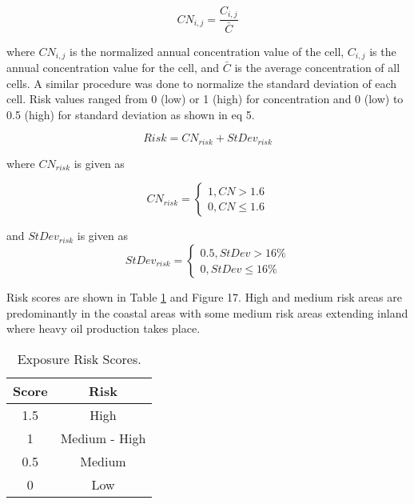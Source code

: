 \begin{equation}
\label{eq:normconcentrate}
CN_{i,j}=\frac{C_{i,j}}{\bar{C}}
\end{equation}

\noindent
where $CN_{i,j}$ is the normalized annual concentration value of the cell, $C_{i,j}$ is the annual concentration value for the cell, and $\bar{C}$ is the average concentration of all cells.  A similar procedure was done to normalize the standard deviation of each cell.  Risk values ranged from 0 (low) or 1 (high) for concentration and 0 (low) to 0.5 (high) for standard deviation as shown in eq 5. 

\begin{equation}
\label{eq:riskscore}
Risk = CN_{risk} + StDev_{risk}
\end{equation}

\noindent
where $CN_{risk}$ is given as

\begin{equation}
\label{eq:riskCN1}
CN_{risk} = \left\{\begin{matrix}
1, CN > 1.6\\ 
0, CN \leq 1.6
\end{matrix}\right.
\end{equation}

\noindent
and $StDev_{risk}$ is given as
\begin{equation}
\label{eq:riskCN2}
StDev_{risk} = \left\{\begin{matrix}
0.5, StDev > 16\%\\ 
0, StDev \leq 16\%
\end{matrix}\right.
\end{equation}

Risk scores are shown in Table \ref{tb:expriskscores} and Figure 17.  High and medium risk areas are predominantly in the coastal areas with some medium risk areas extending inland where heavy oil production takes place.

\begin{table}[H]
\centering
\caption{Exposure Risk Scores.}
\label{tb:expriskscores}
\begin{tabular}{@{}cc@{}}
\toprule
\textbf{Score} & \textbf{Risk} \\ \midrule
1.5 & High          \\
1   & Medium - High \\
0.5  & Medium        \\
0  & Low           \\ \bottomrule
\end{tabular}
\end{table}

